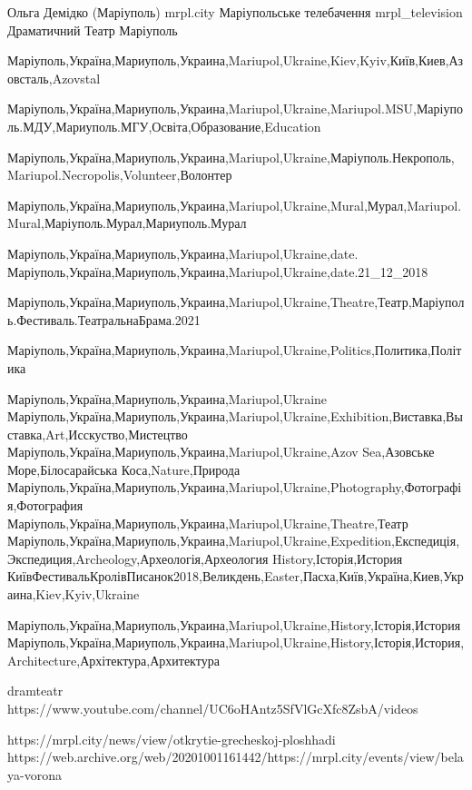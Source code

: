  
 
 
 
 

Ольга Демідко (Маріуполь)
mrpl.city
Маріупольське телебачення mrpl_television
Драматичний Театр Маріуполь

Маріуполь,Україна,Мариуполь,Украина,Mariupol,Ukraine,Kiev,Kyiv,Київ,Киев,Азовсталь,Azovstal

Маріуполь,Україна,Мариуполь,Украина,Mariupol,Ukraine,Mariupol.MSU,Маріуполь.МДУ,Мариуполь.МГУ,Освіта,Образование,Education

Маріуполь,Україна,Мариуполь,Украина,Mariupol,Ukraine,Маріуполь.Некрополь,Mariupol.Necropolis,Volunteer,Волонтер

Маріуполь,Україна,Мариуполь,Украина,Mariupol,Ukraine,Mural,Мурал,Mariupol.Mural,Маріуполь.Мурал,Мариуполь.Мурал

Маріуполь,Україна,Мариуполь,Украина,Mariupol,Ukraine,date.
Маріуполь,Україна,Мариуполь,Украина,Mariupol,Ukraine,date.21_12_2018

Маріуполь,Україна,Мариуполь,Украина,Mariupol,Ukraine,Theatre,Театр,Маріуполь.Фестиваль.ТеатральнаБрама.2021

Маріуполь,Україна,Мариуполь,Украина,Mariupol,Ukraine,Politics,Политика,Політика

Маріуполь,Україна,Мариуполь,Украина,Mariupol,Ukraine
Маріуполь,Україна,Мариуполь,Украина,Mariupol,Ukraine,Exhibition,Виставка,Выставка,Art,Исскуство,Мистецтво
Маріуполь,Україна,Мариуполь,Украина,Mariupol,Ukraine,Azov Sea,Азовське Море,Білосарайська Коса,Nature,Природа
Маріуполь,Україна,Мариуполь,Украина,Mariupol,Ukraine,Photography,Фотографія,Фотография
Маріуполь,Україна,Мариуполь,Украина,Mariupol,Ukraine,Theatre,Театр
Маріуполь,Україна,Мариуполь,Украина,Mariupol,Ukraine,Expedition,Експедиція,Экспедиция,Archeology,Археологія,Археология
History,Історія,История
КиївФестивальКролівПисанок2018,Великдень,Easter,Пасха,Київ,Україна,Киев,Украина,Kiev,Kyiv,Ukraine

Маріуполь,Україна,Мариуполь,Украина,Mariupol,Ukraine,History,Історія,История
Маріуполь,Україна,Мариуполь,Украина,Mariupol,Ukraine,History,Історія,История,Architecture,Архітектура,Архитектура

dramteatr
https://www.youtube.com/channel/UC6oHAntz5SfVlGcXfc8ZsbA/videos

https://mrpl.city/news/view/otkrytie-grecheskoj-ploshhadi
https://web.archive.org/web/20201001161442/https://mrpl.city/events/view/belaya-vorona


